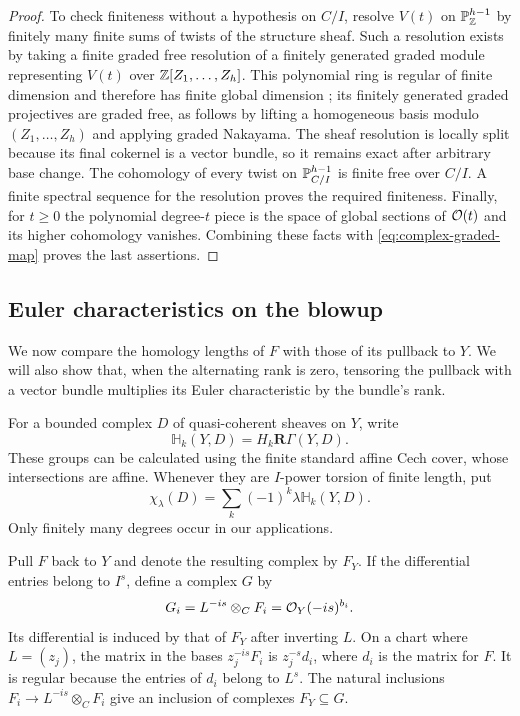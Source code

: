 \begin{proof}
To check finiteness without a hypothesis on $C/I$, resolve $V(t)$ on
$\mathbb P_\mathbb Z^{h-1}$ by finitely many finite sums of twists of the structure
sheaf. Such a resolution exists by taking a finite graded free resolution
of a finitely generated graded module representing $V(t)$ over
$\mathbb Z[Z_1,\ldots,Z_h]$. This polynomial ring is regular of finite
dimension and therefore has finite global dimension
\cite[Tags~07NF and~00OE]{Stacks};
its finitely generated graded projectives are graded free, as follows by
lifting a homogeneous basis modulo $(Z_1,\ldots,Z_h)$ and applying graded
Nakayama. The sheaf resolution is locally split because its final cokernel
is a vector bundle, so it remains exact after arbitrary base change.
The cohomology of every twist on $\mathbb P_{C/I}^{h-1}$ is finite free over
$C/I$. A finite spectral sequence for the resolution proves the required
finiteness. Finally, for $t\geq0$ the polynomial degree-$t$ piece is the
space of global sections of $\mathcal O(t)$ and its higher cohomology vanishes.
Combining these facts with \eqref{eq:complex-graded-map} proves the last
assertions.
\end{proof}

\subsection{Euler characteristics on the blowup}

We now compare the homology lengths of $F$ with those of its pullback
to $Y$. We will also show that, when the alternating rank is zero,
tensoring the pullback with a vector bundle multiplies its Euler
characteristic by the bundle's rank.

For a bounded complex $D$ of quasi-coherent sheaves on $Y$, write
\[
 \mathbb H_k(Y,D)=H_k\mathbf R\Gamma(Y,D).
\]
These groups can be calculated using the finite standard affine Cech
cover, whose intersections are affine. Whenever they are $I$-power torsion
of finite length, put
\[
 \chi_\lambda(D)=\sum_k(-1)^k\lambda\mathbb H_k(Y,D).
\]
Only finitely many degrees occur in our applications.

Pull $F$ back to $Y$ and denote the resulting complex by $F_Y$. If the
differential entries belong to $I^s$, define a complex $G$ by
\begin{equation}\label{eq:complex-G}
 G_i=L^{-is}\otimes_C F_i=\mathcal O_Y(-is)^{b_i}.
\end{equation}
Its differential is induced by that of $F_Y$ after inverting $L$.
On a chart where $L=(z_j)$, the matrix in the bases
$z_j^{-is}F_i$ is $z_j^{-s}d_i$, where $d_i$ is the matrix for $F$.
It is regular because the entries of $d_i$ belong to $L^s$.
The natural inclusions $F_i\to L^{-is}\otimes_C F_i$ give an
inclusion of complexes $F_Y\subseteq G$.

